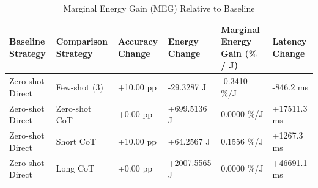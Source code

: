 \begin{table}
\caption{Marginal Energy Gain (MEG) Relative to Baseline}
\label{tab:marginal_energy_gain}
\begin{tabular}{llllll}
\toprule
Baseline Strategy & Comparison Strategy & Accuracy Change & Energy Change & Marginal Energy Gain (\% / J) & Latency Change \\
\midrule
Zero-shot Direct & Few-shot (3) & +10.00 pp & -29.3287 J & -0.3410 \%/J & -846.2 ms \\
Zero-shot Direct & Zero-shot CoT & +0.00 pp & +699.5136 J & 0.0000 \%/J & +17511.3 ms \\
Zero-shot Direct & Short CoT & +10.00 pp & +64.2567 J & 0.1556 \%/J & +1267.3 ms \\
Zero-shot Direct & Long CoT & +0.00 pp & +2007.5565 J & 0.0000 \%/J & +46691.1 ms \\
\bottomrule
\end{tabular}
\end{table}
